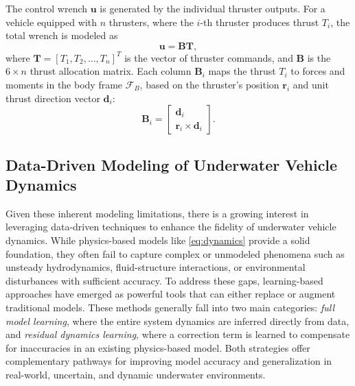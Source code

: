 The control wrench \(\mathbf{u}\) is generated by the individual thruster outputs. For a vehicle equipped with \(n\) thrusters, where the \(i\)-th thruster produces thrust \(T_i\), the total wrench is modeled as
\begin{equation}
    \mathbf{u} = \mathbf{B} \boldsymbol{T},
\end{equation}
where \(\boldsymbol{T} = [T_1, T_2, \ldots, T_n]^T\) is the vector of thruster commands, and \(\mathbf{B}\) is the \(6 \times n\) thrust allocation matrix. Each column \(\mathbf{B}_i\) maps the thrust \(T_i\) to forces and moments in the body frame \(\mathcal{F}_B\), based on the thruster’s position \(\boldsymbol{r}_i\) and unit thrust direction vector \(\boldsymbol{d}_i\):
\begin{equation}
    \mathbf{B}_i = \begin{bmatrix} \boldsymbol{d}_i \\ \boldsymbol{r}_i \times \boldsymbol{d}_i \end{bmatrix}.
\end{equation}


\subsection{Data-Driven Modeling of Underwater Vehicle Dynamics}
Given these inherent modeling limitations, there is a growing interest in leveraging data-driven techniques to enhance the fidelity of underwater vehicle dynamics. While physics-based models like \eqref{eq:dynamics} provide a solid foundation, they often fail to capture complex or unmodeled phenomena such as unsteady hydrodynamics, fluid-structure interactions, or environmental disturbances with sufficient accuracy. To address these gaps, learning-based approaches have emerged as powerful tools that can either replace or augment traditional models. These methods generally fall into two main categories: \textit{full model learning}, where the entire system dynamics are inferred directly from data, and \textit{residual dynamics learning}, where a correction term is learned to compensate for inaccuracies in an existing physics-based model. Both strategies offer complementary pathways for improving model accuracy and generalization in real-world, uncertain, and dynamic underwater environments.






